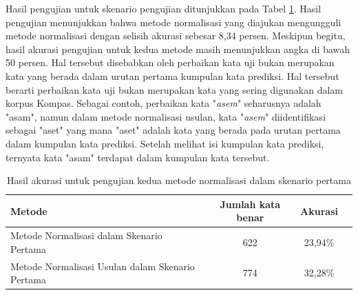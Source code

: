 Hasil pengujian untuk skenario pengujian ditunjukkan pada Tabel \ref{tbl:result_1}. Hasil pengujian menunjukkan bahwa metode normalisasi yang diajukan mengungguli metode normalisasi \parencite{saragih2017normalisasi} dengan selisih akurasi sebesar 8,34 persen. Meskipun begitu, hasil akurasi pengujian untuk kedua metode masih menunjukkan angka di bawah 50 persen. Hal tersebut disebabkan oleh perbaikan kata uji bukan merupakan kata yang berada dalam urutan pertama kumpulan kata prediksi. Hal tersebut berarti perbaikan kata uji bukan merupakan kata yang sering digunakan dalam korpus Kompas. Sebagai contoh, perbaikan kata "\textit{asem}" seharusnya adalah "asam", namun dalam metode normalisasi usulan, kata "\textit{asem}" diidentifikasi sebagai "aset" yang mana "aset" adalah kata yang berada pada urutan pertama dalam kumpulan kata prediksi. Setelah melihat isi kumpulan kata prediksi, ternyata kata "asam" terdapat dalam kumpulan kata tersebut.
\begin{table}[ht]
    \captionsetup{justification=justified,singlelinecheck=false}
    \caption{Hasil akurasi untuk pengujian kedua metode normalisasi dalam skenario pertama}
    \label{tbl:result_1}
    \centering
    \begin{tabularx}{\textwidth}{|X|c|c|c|}
        \hline
        \multicolumn{1}{|Y|}{\textbf{Metode}} & \textbf{Jumlah kata benar} & \textbf{Akurasi} \\ \hline
        Metode Normalisasi \parencite{saragih2017normalisasi} dalam Skenario Pertama & 622 & 23,94\% \\ \hline
        Metode Normalisasi Usulan dalam Skenario Pertama & 774 & 32,28\% \\ \hline
    \end{tabularx}
\end{table}

